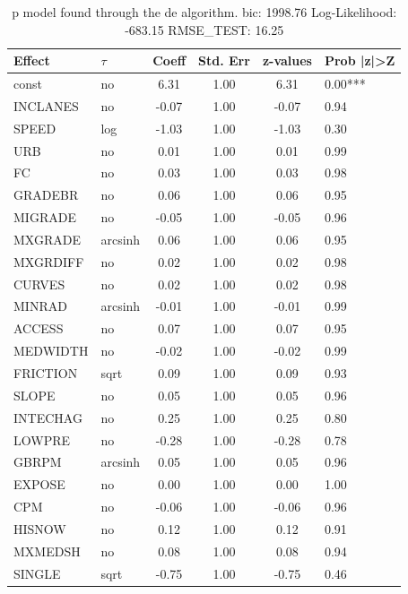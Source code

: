 \begin{table}
	\caption{p model found through the de algorithm. bic: 1998.76 Log-Likelihood: -683.15 RMSE_TEST: 16.25}
	\begin{center}
		\begin{tabular}{|l|l|c|c|c|l|}
			\hline
			Effect & $\tau$ & Coeff & Std. Err & z-values & Prob |z|>Z \\
			\hline
			const & no & 6.31 & 1.00 & 6.31 & 0.00*** \\
			\hline
			INCLANES & no & -0.07 & 1.00 & -0.07 & 0.94 \\
			\hline
			SPEED & log & -1.03 & 1.00 & -1.03 & 0.30 \\
			\hline
			URB & no & 0.01 & 1.00 & 0.01 & 0.99 \\
			\hline
			FC & no & 0.03 & 1.00 & 0.03 & 0.98 \\
			\hline
			GRADEBR & no & 0.06 & 1.00 & 0.06 & 0.95 \\
			\hline
			MIGRADE & no & -0.05 & 1.00 & -0.05 & 0.96 \\
			\hline
			MXGRADE & arcsinh & 0.06 & 1.00 & 0.06 & 0.95 \\
			\hline
			MXGRDIFF & no & 0.02 & 1.00 & 0.02 & 0.98 \\
			\hline
			CURVES & no & 0.02 & 1.00 & 0.02 & 0.98 \\
			\hline
			MINRAD & arcsinh & -0.01 & 1.00 & -0.01 & 0.99 \\
			\hline
			ACCESS & no & 0.07 & 1.00 & 0.07 & 0.95 \\
			\hline
			MEDWIDTH & no & -0.02 & 1.00 & -0.02 & 0.99 \\
			\hline
			FRICTION & sqrt & 0.09 & 1.00 & 0.09 & 0.93 \\
			\hline
			SLOPE & no & 0.05 & 1.00 & 0.05 & 0.96 \\
			\hline
			INTECHAG & no & 0.25 & 1.00 & 0.25 & 0.80 \\
			\hline
			LOWPRE & no & -0.28 & 1.00 & -0.28 & 0.78 \\
			\hline
			GBRPM & arcsinh & 0.05 & 1.00 & 0.05 & 0.96 \\
			\hline
			EXPOSE & no & 0.00 & 1.00 & 0.00 & 1.00 \\
			\hline
			CPM & no & -0.06 & 1.00 & -0.06 & 0.96 \\
			\hline
			HISNOW & no & 0.12 & 1.00 & 0.12 & 0.91 \\
			\hline
			MXMEDSH & no & 0.08 & 1.00 & 0.08 & 0.94 \\
			\hline
			SINGLE & sqrt & -0.75 & 1.00 & -0.75 & 0.46 \\

\end{tabular}
\end{center}
\end{table}
